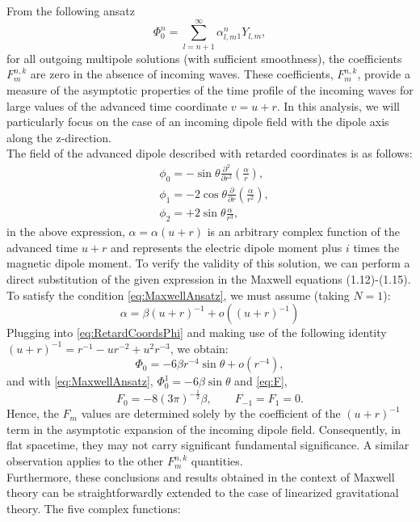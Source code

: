 From the following ansatz
\begin{equation}\label{eq:Phi0ansatz}
  \Phi_{0}^{n} = \sum_{l = n+1}^{\infty}\alpha_{l,m}^{n} {_{1}Y_{l,m}},
\end{equation}
for all outgoing multipole solutions (with sufficient smoothness), the coefficients $F_{m}^{n,k}$ are zero in the absence of incoming waves. These coefficients, $F_{m}^{n,k}$, provide a measure of the asymptotic properties of the time profile of the incoming waves for large values of the advanced time coordinate $v = u + r$. In this analysis, we will particularly focus on the case of an incoming dipole field with the dipole axis along the z-direction.\\
The field of the advanced dipole described with retarded coordinates is as follows:
\begin{align}\label{eq:RetardCoordsPhi}
  & \phi_{0} = -\sin\theta \frac{\partial^{2}}{\partial r^{2}}\left(\frac{\alpha}{r}\right), \nonumber \\ 
  & \phi_{1} = -2 \cos\theta \frac{\partial}{\partial r}\left(\frac{\alpha}{r^2}\right), \nonumber \\ 
  & \phi_{2} = +2 \sin\theta \frac{\alpha}{r^{3}},
\end{align}
in the above expression, $\alpha = \alpha(u + r)$ is an arbitrary complex function of the advanced time $u + r$ and represents the electric dipole moment plus $i$ times the magnetic dipole moment.
To verify the validity of this solution, we can perform a direct substitution of the given expression in the Maxwell equations (1.12)-(1.15). To satisfy the condition \eqref{eq:MaxwellAnsatz}, we must assume (taking $N = 1$):
$$\alpha = \beta(u+r)^{-1} + o((u+r)^{-1})$$
Plugging into \eqref{eq:RetardCoordsPhi} and making use of the following identity $(u+r)^{-1} = r^{-1}-ur^{-2}+u^{2}r^{-3}$, we obtain:
\begin{equation}\label{eq:Phi0retard}
  \Phi_{0} = -6\beta r^{-4}\sin\theta + o(r^{-4}),
\end{equation}
and with \eqref{eq:MaxwellAnsatz}, $\Phi_{0}^{1} = -6\beta \sin\theta$ and \eqref{eq:F}, $$F_{0} = -8(3\pi)^{-\frac{1}{2}}\beta, \qquad F_{-1} = F_{1} = 0.$$
Hence, the $F_m$ values are determined solely by the coefficient of the $(u + r)^{-1}$ term in the asymptotic expansion of the incoming dipole field. Consequently, in flat spacetime, they may not carry significant fundamental significance. A similar observation applies to the other $F_{m}^{n,k}$ quantities.\\
Furthermore, these conclusions and results obtained in the context of Maxwell theory can be straightforwardly extended to the case of linearized gravitational theory. The five complex functions:
